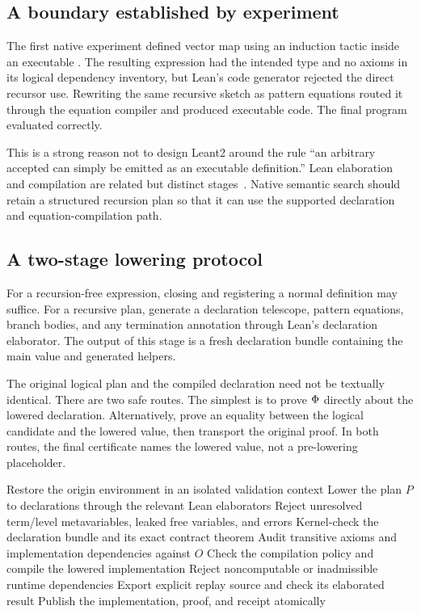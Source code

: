 \subsection{A boundary established by experiment}

The first native experiment defined vector map using an induction tactic inside an executable . The resulting expression had the intended type and no axioms in its logical dependency inventory, but Lean's code generator rejected the direct recursor use. Rewriting the same recursive sketch as pattern equations routed it through the equation compiler and produced executable code. The final program evaluated correctly.

This is a strong reason not to design Leant2 around the rule ``an arbitrary accepted  can simply be emitted as an executable definition.'' Lean elaboration and compilation are related but distinct stages~\cite{lean-compilation}. Native semantic search should retain a structured recursion plan so that it can use the supported declaration and equation-compilation path.

\subsection{A two-stage lowering protocol}

For a recursion-free expression, closing and registering a normal definition may suffice. For a recursive plan, generate a declaration telescope, pattern equations, branch bodies, and any termination annotation through Lean's declaration elaborator. The output of this stage is a fresh declaration bundle containing the main value and generated helpers.

The original logical plan and the compiled declaration need not be textually identical. There are two safe routes. The simplest is to prove $\Phi$ directly about the lowered declaration. Alternatively, prove an equality between the logical candidate and the lowered value, then transport the original proof. In both routes, the final certificate names the lowered value, not a pre-lowering placeholder.

\begin{algorithm}[ht]
\caption{Lower and authorize a candidate bundle}
\label{alg:publish}
\begin{algorithmic}[1]
 \State Restore the origin environment in an isolated validation context
 \State Lower the plan $P$ to declarations through the relevant Lean elaborators
 \State Reject unresolved term/level metavariables, leaked free variables, and errors
 \State Kernel-check the declaration bundle and its exact contract theorem
 \State Audit transitive axioms and implementation dependencies against $O$
   \State Check the compilation policy and compile the lowered implementation
   \State Reject noncomputable or inadmissible runtime dependencies
 \EndIf
 \State Export explicit replay source and check its elaborated result
 \State Publish the implementation, proof, and receipt atomically
\EndFunction
\end{algorithmic}
\end{algorithm}

